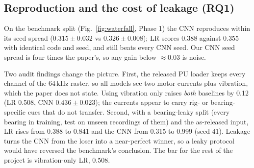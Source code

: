 \documentclass[conference]{IEEEtran}
\newcommand{\mF}{macro-F1}
\begin{document}
\begin{table}[t]
\centering
\caption{Chronological steps over ten rotated bearing hold-outs (\mF{}, mean $\pm$ std over folds; fold 0 is the benchmark split)}
\label{tab:steps}
\setlength{\tabcolsep}{2.5pt}
\end{table}

\subsection{Reproduction and the cost of leakage (RQ1)}\label{sec:repro}
On the benchmark split (Fig.~\ref{fig:waterfall}, Phase 1) the CNN reproduces within its seed
spread ($0.315\pm0.032$ vs $0.326\pm0.008$); LR scores 0.388 against 0.355 with identical code
and seed, and still beats every CNN seed. Our CNN seed spread is four times the paper's, so any
gain below $\approx$0.03 is noise.

Two audit findings change the picture. First, the released PU loader keeps every channel of the
64\,kHz raster, so all models see two motor currents plus vibration, which the paper does not
state. Using vibration only raises \emph{both} baselines by 0.12 (LR 0.508, CNN
$0.436\pm0.023$); the currents appear to carry rig- or bearing-specific cues that do not
transfer. Second, with a bearing-leaky split (every bearing in training, test on unseen
recordings of them) and the as-released input, LR rises from 0.388 to 0.841 and the CNN from
0.315 to 0.999 (seed 41). Leakage turns the CNN from
the loser into a near-perfect winner, so a leaky protocol would have reversed the benchmark's
conclusion. The bar for the rest of the project is vibration-only LR, 0.508.
\end{document}
